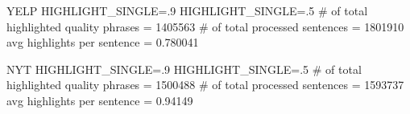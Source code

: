 YELP 
HIGHLIGHT_SINGLE=.9
HIGHLIGHT_SINGLE=.5
# of total highlighted quality phrases = 1405563
   # of total processed sentences = 1801910
   avg highlights per sentence = 0.780041

NYT
HIGHLIGHT_SINGLE=.9
HIGHLIGHT_SINGLE=.5
# of total highlighted quality phrases = 1500488
   # of total processed sentences = 1593737
   avg highlights per sentence = 0.94149